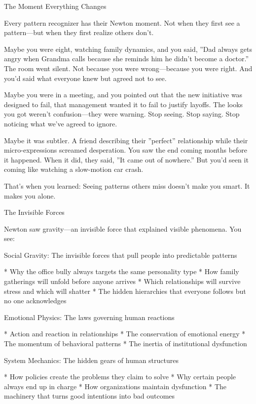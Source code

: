 \documentclass[12pt,oneside]{book}
\begin{document}
The Moment Everything Changes

Every pattern recognizer has their Newton moment. Not when they first see a pattern---but when they first realize others don't.

Maybe you were eight, watching family dynamics, and you said, ''Dad always gets angry when Grandma calls because she reminds him he didn't become a doctor.'' The room went silent. Not because you were wrong---because you were right. And you'd said what everyone knew but agreed not to see.

Maybe you were in a meeting, and you pointed out that the new initiative was designed to fail, that management wanted it to fail to justify layoffs. The looks you got weren't confusion---they were warning. Stop seeing. Stop saying. Stop noticing what we've agreed to ignore.

Maybe it was subtler. A friend describing their ''perfect'' relationship while their micro-expressions screamed desperation. You saw the end coming months before it happened. When it did, they said, ''It came out of nowhere.'' But you'd seen it coming like watching a slow-motion car crash.

That's when you learned: Seeing patterns others miss doesn't make you smart. It makes you alone.

The Invisible Forces

Newton saw gravity---an invisible force that explained visible phenomena. You see:

Social Gravity: The invisible forces that pull people into predictable patterns

                    * Why the office bully always targets the same personality type
                    * How family gatherings will unfold before anyone arrives
                    * Which relationships will survive stress and which will shatter
                    * The hidden hierarchies that everyone follows but no one acknowledges

Emotional Physics: The laws governing human reactions

                    * Action and reaction in relationships
                    * The conservation of emotional energy
                    * The momentum of behavioral patterns
                    * The inertia of institutional dysfunction

System Mechanics: The hidden gears of human structures

                    * How policies create the problems they claim to solve
                    * Why certain people always end up in charge
                    * How organizations maintain dysfunction
                    * The machinery that turns good intentions into bad outcomes
\end{document}
